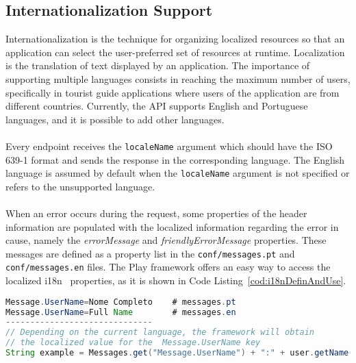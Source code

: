 \subsection{Internationalization Support}
\label{sec:apiInternationalization}
Internationalization is the technique for organizing localized resources so that an application can select the user-preferred set of resources at runtime. Localization is the translation of text displayed by an application. The importance of supporting multiple languages consists in reaching the maximum number of users, specifically in tourist guide applications where users of the application are from different countries. Currently, the API supports English and Portuguese languages, and it is possible to add other languages.\\
\\
Every endpoint receives the \verb"localeName" argument which should have the ISO 639-1 format and sends the response in the corresponding language. The English language is assumed by default when the \verb"localeName" argument is not specified or refers to the unsupported language.\\
\\
When an error occurs during the request, some properties of the header information are populated with the localized information regarding the error in cause, namely the \emph{errorMessage} and \emph{friendlyErrorMessage} properties. These messages are defined as a property list in the \verb"conf/messages.pt" and \verb"conf/messages.en" files. The Play framework offers an easy way to access the localized i18n~\cite{i18nOrigin} properties, as it is shown in Code Listing~\ref{cod:i18nDefinAndUse}.
\newpage
\begin{lstlisting}[language=java,caption={An example of the i18n definition and usage.},label={cod:i18nDefinAndUse}, frame=bt]
Message.UserName=Nome Completo    # messages.pt
Message.UserName=Full Name        # messages.en
------------------------------
// Depending on the current language, the framework will obtain 
// the localized value for the  Message.UserName key
String example = Messages.get("Message.UserName") + ":" + user.getName();
\end{lstlisting}
